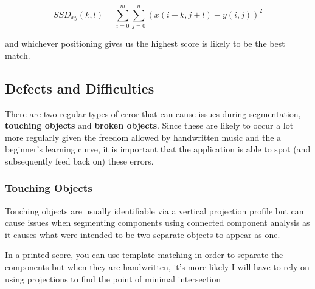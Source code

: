 $$SSD_{xy}(k, l) = \sum_{i = 0}^m \sum_{j = 0}^n (x(i + k, j + l) - y(i, j))^2$$

and whichever positioning gives us the highest score is likely to be the best match.

\subsection{Defects and Difficulties}

There are two regular types of error that can cause issues during segmentation, \textbf{touching objects} and \textbf{broken objects}. Since these are likely to occur a lot more regularly given the freedom allowed by handwritten music and the a beginner's learning curve, it is important that the application is able to spot (and subsequently feed back on) these errors.

\subsubsection{Touching Objects}

Touching objects are usually identifiable via a vertical projection profile  but can cause issues when segmenting components using  connected component analysis as it causes what were intended to be two separate objects to appear as one.


In a printed score, you can use  template matching in order to separate the components but when they are handwritten, it's more likely I will have to rely on using projections to find the point of minimal intersection 
